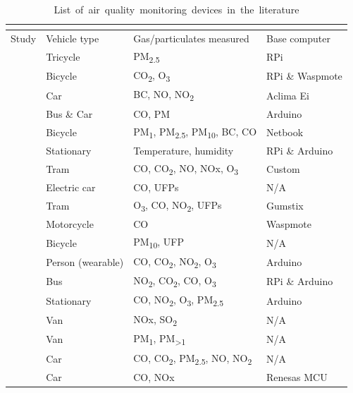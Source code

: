 \documentclass[11pt]{report}
\begin{document}
\begin{landscape}
  \small
\begin{longtable}{ p{} p{} p{} p{} }
  \caption{\mbox{List of air quality monitoring devices in the literature}}
  \vspace{-0.4cm}
  \label{listofprevdevices} \\
  \toprule
  Study & Vehicle type & Gas/particulates measured & Base computer \\ \midrule
  \cite{Jabbar2017bikefossarchitecture} & Tricycle & PM\textsubscript{2.5} & RPi \\ \midrule
  \cite{Alvear2016ecosensor} & Bicycle & CO\textsubscript{2}, O\textsubscript{3} & RPi \& Waspmote\\ \midrule
  \cite{Apte2017googlestreetview} & Car & BC, NO, NO\textsubscript{2} & Aclima Ei \\ \midrule
  \cite{Devarakonda2013} & Bus \& Car & CO, PM & Arduino \\ \midrule
  \cite{Elen2013aeroflex} & Bicycle & PM\textsubscript{1}, PM\textsubscript{2.5}, PM\textsubscript{10}, BC, CO & Netbook \\ \midrule
  \cite{Ferdoush2014rasppiandarduino} & Stationary & Temperature, humidity & RPi \& Arduino \\ \midrule
  \cite{Hagemann2014aerotram} & Tram & CO, CO\textsubscript{2}, NO, NOx, O\textsubscript{3}  & Custom \\ \midrule
  \cite{Hagler2010durhamallelectric} & Electric car & CO, UFPs & N/A \\ \midrule
  \cite{Hasenfratz2015highresmapsTram} & Tram & O\textsubscript{3}, CO, NO\textsubscript{2}, UFPs & Gumstix \\ \midrule
  \cite{Hoang2013hanoihexagons} & Motorcycle & CO & Waspmote \\ \midrule
  \cite{Peters2013cycleruns} & Bicycle & PM\textsubscript{10}, UFP & N/A \\ \midrule
  \cite{Piedrahita2014quantexposuremtrng} & Person (wearable) & CO, CO\textsubscript{2}, NO\textsubscript{2}, O\textsubscript{3} & Arduino \\ \midrule
  \cite{2014busairqualityVSN} & Bus & NO\textsubscript{2}, CO\textsubscript{2}, CO, O\textsubscript{3} & RPi \& Arduino \\ \midrule
  \cite{sun2016HKmarathonML} & Stationary & CO, NO\textsubscript{2}, O\textsubscript{3}, PM\textsubscript{2.5} & Arduino \\ \midrule
  \cite{Wallace2009mobilehamilton} & Van & NOx, SO\textsubscript{2} & N/A \\ \midrule
  \cite{Weijers2004movingmeasurementunit} & Van & PM\textsubscript{1}, PM\textsubscript{\textgreater 1} & N/A \\ \midrule
  \cite{Westerdahl2005losangeles} & Car & CO, CO\textsubscript{2}, PM\textsubscript{2.5}, NO, NO\textsubscript{2} & N/A \\ \midrule
  \cite{Wong2009envmonitoringtemporal} & Car & CO, NOx & Renesas MCU \\ \bottomrule
  \hline
\end{longtable}


\end{landscape}
\end{document}
